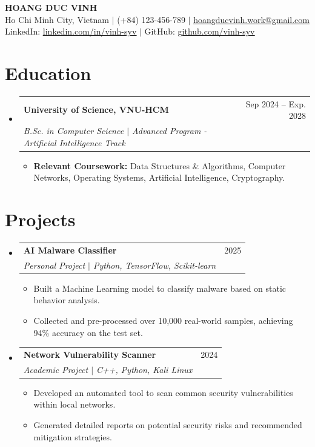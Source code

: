 \documentclass[11pt,a4paper]{article}
\makeatletter
\newcommand{\resumeItem}[1]{\item\small{#1 \vspace{-2pt}}}
\newcommand{\resumeSubheading}[4]{
  \vspace{-1pt}\item
    \begin{tabular*}{0.97\textwidth}[t]{l@{\extracolsep{\fill}}r}
      \textbf{#1} & #2 \\
      \textit{\small#3} & \textit{\small #4} \\
    \end{tabular*}\vspace{-5pt}
}
\makeatother
\begin{document}
\begin{center}
    \textbf{\Huge HOANG DUC VINH} \\ \vspace{5pt}
    Ho Chi Minh City, Vietnam $|$ (+84) 123-456-789 $|$ \href{mailto:hoangducvinh.work@gmail.com}{\underline{hoangducvinh.work@gmail.com}} \\
    LinkedIn: \href{https://linkedin.com/in/vinh-syv}{\underline{linkedin.com/in/vinh-syv}} $|$ GitHub: \href{https://github.com/vinh-syv}{\underline{github.com/vinh-syv}}
\end{center}

\section{Education}
\begin{itemize}[leftmargin=0.15in, label={}]
  \resumeSubheading
    {University of Science, VNU-HCM}{Sep 2024 -- Exp. 2028}
    {B.Sc. in Computer Science $|$ Advanced Program - Artificial Intelligence Track}{}
  \begin{itemize}
    \resumeItem{\textbf{Relevant Coursework:} Data Structures \& Algorithms, Computer Networks, Operating Systems, Artificial Intelligence, Cryptography.}
  \end{itemize}
\end{itemize}

\section{Projects}
\begin{itemize}[leftmargin=0.15in, label={}]
  \resumeSubheading
    {AI Malware Classifier}{2025}
    {Personal Project $|$ Python, TensorFlow, Scikit-learn}{}
  \begin{itemize}
    \resumeItem{Built a Machine Learning model to classify malware based on static behavior analysis.}
    \resumeItem{Collected and pre-processed over 10,000 real-world samples, achieving 94\% accuracy on the test set.}
  \end{itemize}

  \vspace{3pt}
  \resumeSubheading
    {Network Vulnerability Scanner}{2024}
    {Academic Project $|$ C++, Python, Kali Linux}{}
  \begin{itemize}
    \resumeItem{Developed an automated tool to scan common security vulnerabilities within local networks.}
    \resumeItem{Generated detailed reports on potential security risks and recommended mitigation strategies.}
  \end{itemize}
\end{itemize}
\end{document}
